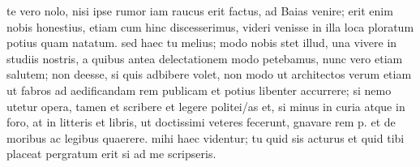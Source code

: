  te vero nolo, nisi ipse rumor iam raucus erit factus, ad Baias venire; erit enim nobis honestius, etiam cum hinc discesserimus, videri venisse in illa loca ploratum potius quam natatum. sed haec tu melius; modo nobis stet illud, una vivere in studiis nostris, a quibus antea delectationem modo petebamus, nunc vero etiam salutem; non deesse, si quis adbibere volet, non modo ut architectos verum etiam ut fabros ad aedificandam rem publicam et potius libenter accurrere; si nemo utetur opera, tamen et scribere et legere politei/as et, si minus in curia atque in foro, at in litteris et libris, ut doctissimi veteres fecerunt, gnavare rem p. et de moribus ac legibus quaerere. mihi haec videntur; tu quid sis acturus et quid tibi placeat pergratum erit si ad me scripseris.
